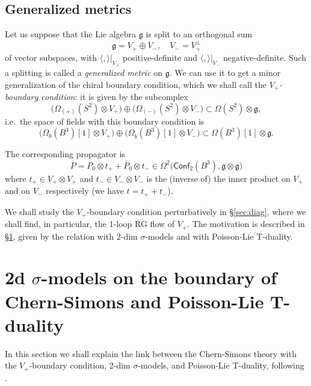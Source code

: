 \documentclass[a4paper]{amsart}
\theoremstyle{plain}
\theoremstyle{definition}
\newcommand{\g}{\mathfrak{g}}
\newcommand{\la}{\langle}
\newcommand{\ra}{\rangle}
\newcommand{\cf}{\mathsf{Conf}}
\begin{document}
\subsection{Generalized metrics}\label{sec:gm}
Let us suppose that the Lie algebra $\g$ is split to an orthogonal sum
$$\g=V_+\oplus V_-,\quad V_-=V_+^\perp$$
of vector subspaces, with $\la,\ra|_{V_+}$ positive-definite and $\la,\ra|_{V_-}$ negative-definite. Such a splitting is called a \emph{generalized metric} on $\g$. We can use it to get  a minor generalization of the chiral boundary condition, which we shall call the \emph{$V_+$-boundary condition}: it is given by the subcomplex
$$\bigl(\Omega_{(+)}(S^2)\otimes V_+\bigr) \oplus \bigl(\Omega_{(-)}(S^2)\otimes V_-\bigr) \subset\Omega(S^2)\otimes\g,$$
i.e.\ the  space of fields with this boundary condition is
$$\bigl(\Omega_{b}(B^3)[1]\otimes V_+\bigr) \oplus \bigl(\Omega_{\bar b}(B^3)[1]\otimes V_-\bigr)\subset \Omega(B^3)[1]\otimes\g.
$$

The corresponding propagator is
\begin{equation}\label{gmprop}
P=P_0\otimes t_+ + \bar P_0\otimes t_-\in \Omega^2\bigl(\cf_2(B^3),\g\otimes\g\bigr)
\end{equation}
where $t_+\in V_+\otimes V_+$ and $t_-\in V_-\otimes V_-$ is the (inverse of) the inner product on $V_+$ and on $V_-$ respectively (we have $t = t_+ + t_-$).

\medskip
We shall study the $V_+$-boundary condition perturbatively in \S\ref{sec:diag}, where we shall find, in particular, the 1-loop RG flow of $V_+$. The motivation is described in \S\ref{sec:PL}, given by the relation with 2-dim $\sigma$-models and with Poisson-Lie T-duality.


\section{2d $\sigma$-models on the boundary of Chern-Simons and Poisson-Lie T-duality}\label{sec:PL}

In this section we shall explain the link between the Chern-Simons theory with the $V_+$-boundary condition, 2-dim $\sigma$-models, and Poisson-Lie T-duality, following \cite{S, PSV}.
\end{document}
